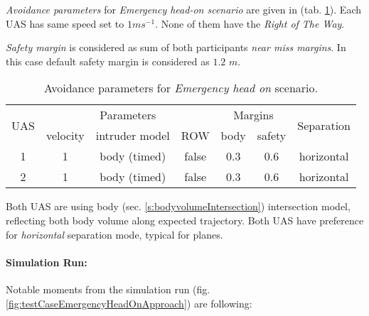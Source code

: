 \noindent \emph{Avoidance parameters} for \emph{Emergency head-on scenario} are given in (tab. \ref{tab:aboidanceParametersForEmergencyHeadOnScenario}). Each UAS has same speed set to $1 m s^{-1}$. None of them have the \emph{Right of The Way}. 

\emph{Safety margin} is considered as sum of both participants \emph{near miss margins}. In this case default safety margin is considered as $1.2$ $m$.

\begin{table}[H]
    \centering
    \begin{tabular}{c||c|c|c||c|c||c}
        \multirow{2}{*}{UAS} & \multicolumn{3}{c||}{Parameters} & \multicolumn{2}{c||}{Margins} & \multirow{2}{*}{Separation}                                            \\\cline{2-6}
                             & velocity & intruder model & ROW        & body & safety \\\hline\hline
        1                    & 1        & body (timed)  & false            & 0.3         & 0.6           & horizontal\\\hline
        2                    & 1        & body (timed)  & false             & 0.3         & 0.6  & horizontal          \\
    \end{tabular}
    \caption{Avoidance parameters for  \emph{Emergency head on} scenario.}
    \label{tab:aboidanceParametersForEmergencyHeadOnScenario}
\end{table}


\begin{note}
Both UAS are using  body (sec. \ref{s:bodyvolumeIntersection}) intersection model, reflecting both body volume along expected trajectory. Both UAS have preference for \emph{horizontal} separation mode, typical for planes.
\end{note}

\paragraph{Simulation Run:} Notable moments from the simulation run (fig. \ref{fig:testCaseEmergencyHeadOnApproach}) are following:

